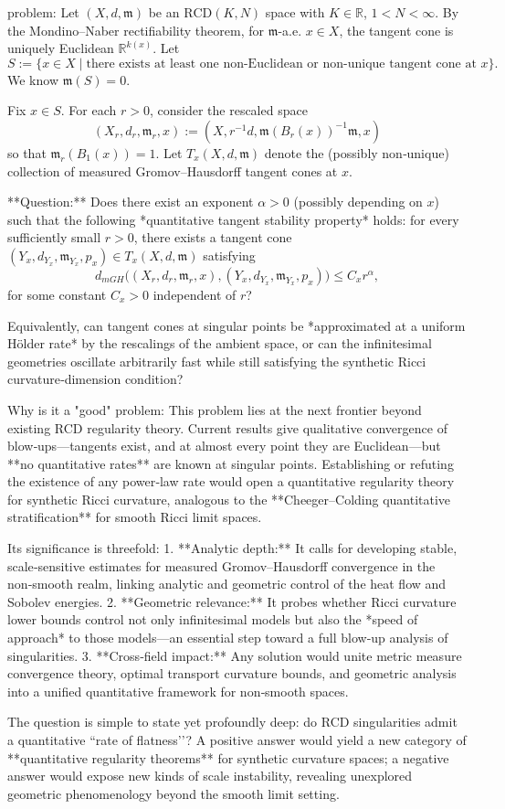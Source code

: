 problem:  
Let \((X,d,\mathfrak{m})\) be an \(\mathrm{RCD}(K,N)\) space with \(K \in \mathbb{R}\), \(1 < N < \infty\).  
By the Mondino–Naber rectifiability theorem, for \(\mathfrak{m}\)-a.e. \(x\in X\), the tangent cone is uniquely Euclidean \(\mathbb{R}^{k(x)}\).  
Let
\[
S := \{x \in X \mid \text{there exists at least one non‑Euclidean or non‑unique tangent cone at } x\}.
\]
We know \(\mathfrak{m}(S)=0\).

Fix \(x \in S\). For each \(r>0\), consider the rescaled space
\[
(X_r, d_r, \mathfrak{m}_r, x) := (X, r^{-1}d, \mathfrak{m}(B_r(x))^{-1}\mathfrak{m}, x)
\]
so that \(\mathfrak{m}_r(B_1(x))=1\).  
Let \(T_x(X,d,\mathfrak{m})\) denote the (possibly non‑unique) collection of measured Gromov–Hausdorff tangent cones at \(x\).

**Question:**  
Does there exist an exponent \(\alpha>0\) (possibly depending on \(x\)) such that the following *quantitative tangent stability property* holds:  
for every sufficiently small \(r>0\), there exists a tangent cone \((Y_x, d_{Y_x}, \mathfrak{m}_{Y_x}, p_x) \in T_x(X,d,\mathfrak{m})\) satisfying
\[
d_{mGH}\big( (X_r, d_r, \mathfrak{m}_r, x), (Y_x, d_{Y_x}, \mathfrak{m}_{Y_x}, p_x) \big) \le C_x r^{\alpha},
\]
for some constant \(C_x>0\) independent of \(r\)?  

Equivalently, can tangent cones at singular points be *approximated at a uniform Hölder rate* by the rescalings of the ambient space, or can the infinitesimal geometries oscillate arbitrarily fast while still satisfying the synthetic Ricci curvature‑dimension condition?

Why is it a "good" problem:  
This problem lies at the next frontier beyond existing RCD regularity theory. Current results give qualitative convergence of blow‑ups—tangents exist, and at almost every point they are Euclidean—but **no quantitative rates** are known at singular points. Establishing or refuting the existence of any power‑law rate would open a quantitative regularity theory for synthetic Ricci curvature, analogous to the **Cheeger–Colding quantitative stratification** for smooth Ricci limit spaces.  

Its significance is threefold:  
1. **Analytic depth:** It calls for developing stable, scale‑sensitive estimates for measured Gromov–Hausdorff convergence in the non‑smooth realm, linking analytic and geometric control of the heat flow and Sobolev energies.  
2. **Geometric relevance:** It probes whether Ricci curvature lower bounds control not only infinitesimal models but also the *speed of approach* to those models—an essential step toward a full blow‑up analysis of singularities.  
3. **Cross‑field impact:** Any solution would unite metric measure convergence theory, optimal transport curvature bounds, and geometric analysis into a unified quantitative framework for non‑smooth spaces.  

The question is simple to state yet profoundly deep: do RCD singularities admit a quantitative “rate of flatness’’?  
A positive answer would yield a new category of **quantitative regularity theorems** for synthetic curvature spaces; a negative answer would expose new kinds of scale instability, revealing unexplored geometric phenomenology beyond the smooth limit setting.